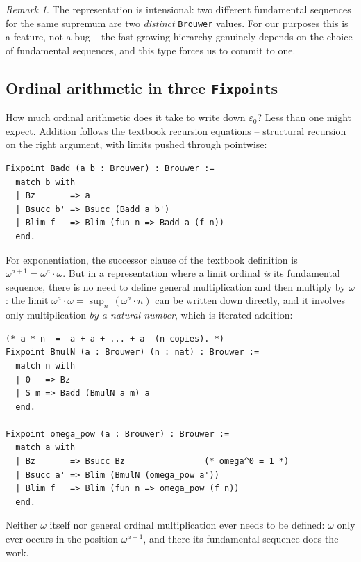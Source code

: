 \documentclass[11pt,a4paper]{article}
\theoremstyle{plain}
\theoremstyle{definition}
\theoremstyle{remark}
\newtheorem{remark}[theorem]{Remark}
\begin{document}
\begin{remark}
The representation is intensional: two different fundamental sequences
for the same supremum are two \emph{distinct} \texttt{Brouwer} values.
For our purposes this is a feature, not a bug -- the fast-growing
hierarchy genuinely depends on the choice of fundamental sequences,
and this type forces us to commit to one.
\end{remark}

\subsection{Ordinal arithmetic in three \texttt{Fixpoint}s}

How much ordinal arithmetic does it take to write down
$\varepsilon_0$?  Less than one might expect.  Addition follows the
textbook recursion equations -- structural recursion on the right
argument, with limits pushed through pointwise:

\begin{lstlisting}
Fixpoint Badd (a b : Brouwer) : Brouwer :=
  match b with
  | Bz       => a
  | Bsucc b' => Bsucc (Badd a b')
  | Blim f   => Blim (fun n => Badd a (f n))
  end.
\end{lstlisting}

For exponentiation, the successor clause of the textbook definition
is $\omega^{a+1} = \omega^a \cdot \omega$.  But in a representation
where a limit ordinal \emph{is} its fundamental sequence, there is no
need to define general multiplication and then multiply by $\omega$:
the limit $\omega^a \cdot \omega = \sup_n\, (\omega^a \cdot n)$ can
be written down directly, and it involves only multiplication
\emph{by a natural number}, which is iterated addition:

\begin{lstlisting}
(* a * n  =  a + a + ... + a  (n copies). *)
Fixpoint BmulN (a : Brouwer) (n : nat) : Brouwer :=
  match n with
  | 0   => Bz
  | S m => Badd (BmulN a m) a
  end.

Fixpoint omega_pow (a : Brouwer) : Brouwer :=
  match a with
  | Bz       => Bsucc Bz                (* omega^0 = 1 *)
  | Bsucc a' => Blim (BmulN (omega_pow a'))
  | Blim f   => Blim (fun n => omega_pow (f n))
  end.
\end{lstlisting}

Neither $\omega$ itself nor general ordinal multiplication ever needs
to be defined: $\omega$ only ever occurs in the position
$\omega^{a+1}$, and there its fundamental sequence does the work.
\end{document}
